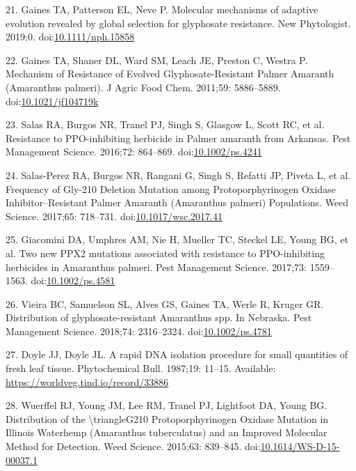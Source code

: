 \documentclass[10pt,letterpaper]{article}
\begin{document}
\leavevmode\hypertarget{ref-gaines_molecular_2019}{}%
21. Gaines TA, Patterson EL, Neve P. Molecular mechanisms of adaptive
evolution revealed by global selection for glyphosate resistance. New
Phytologist. 2019;0.
doi:\href{https://doi.org/10.1111/nph.15858}{10.1111/nph.15858}

\leavevmode\hypertarget{ref-gaines_mechanism_2011}{}%
22. Gaines TA, Shaner DL, Ward SM, Leach JE, Preston C, Westra P.
Mechanism of Resistance of Evolved Glyphosate-Resistant Palmer Amaranth
(Amaranthus palmeri). J Agric Food Chem. 2011;59: 5886--5889.
doi:\href{https://doi.org/10.1021/jf104719k}{10.1021/jf104719k}

\leavevmode\hypertarget{ref-salas_resistance_2016}{}%
23. Salas RA, Burgos NR, Tranel PJ, Singh S, Glasgow L, Scott RC, et al.
Resistance to PPO-inhibiting herbicide in Palmer amaranth from Arkansas.
Pest Management Science. 2016;72: 864--869.
doi:\href{https://doi.org/10.1002/ps.4241}{10.1002/ps.4241}

\leavevmode\hypertarget{ref-salas-perez_frequency_2017}{}%
24. Salas-Perez RA, Burgos NR, Rangani G, Singh S, Refatti JP, Piveta L,
et al. Frequency of Gly-210 Deletion Mutation among Protoporphyrinogen
Oxidase Inhibitor--Resistant Palmer Amaranth (Amaranthus palmeri)
Populations. Weed Science. 2017;65: 718--731.
doi:\href{https://doi.org/10.1017/wsc.2017.41}{10.1017/wsc.2017.41}

\leavevmode\hypertarget{ref-giacomini_two_2017-1}{}%
25. Giacomini DA, Umphres AM, Nie H, Mueller TC, Steckel LE, Young BG,
et al. Two new PPX2 mutations associated with resistance to
PPO-inhibiting herbicides in Amaranthus palmeri. Pest Management
Science. 2017;73: 1559--1563.
doi:\href{https://doi.org/10.1002/ps.4581}{10.1002/ps.4581}

\leavevmode\hypertarget{ref-vieira_distribution_2018}{}%
26. Vieira BC, Samuelson SL, Alves GS, Gaines TA, Werle R, Kruger GR.
Distribution of glyphosate-resistant Amaranthus spp. In Nebraska. Pest
Management Science. 2018;74: 2316--2324.
doi:\href{https://doi.org/10.1002/ps.4781}{10.1002/ps.4781}

\leavevmode\hypertarget{ref-doyle_rapid_1987}{}%
27. Doyle JJ, Doyle JL. A rapid DNA isolation procedure for small
quantities of fresh leaf tissue. Phytochemical Bull. 1987;19: 11--15.
Available: \url{https://worldveg.tind.io/record/33886}

\leavevmode\hypertarget{ref-wuerffel_distribution_2015}{}%
28. Wuerffel RJ, Young JM, Lee RM, Tranel PJ, Lightfoot DA, Young BG.
Distribution of the \textbackslash{}triangleG210 Protoporphyrinogen
Oxidase Mutation in Illinois Waterhemp (Amaranthus tuberculatus) and an
Improved Molecular Method for Detection. Weed Science. 2015;63:
839--845.
doi:\href{https://doi.org/10.1614/WS-D-15-00037.1}{10.1614/WS-D-15-00037.1}
\end{document}
